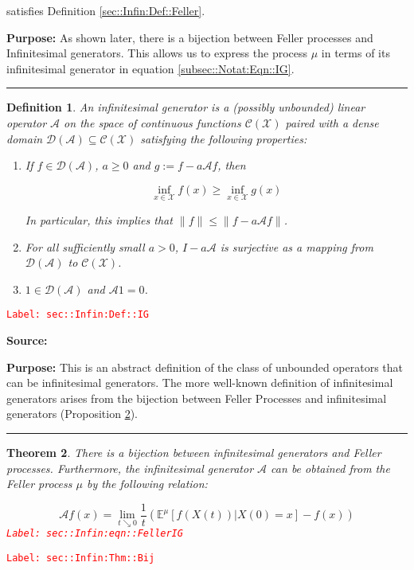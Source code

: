 \documentclass[12pt]{article}
\newcommand{\mb}{\mathbb}
\newcommand{\mc}{\mathcal}
\newcommand{\tr}{\textcolor{red}}
\newcommand{\labe}[1]{\tr{\texttt{Label: #1}}}
\newcommand{\purpose}{\textbf{Purpose: }}
\newcommand{\lin}{\rule{\linewidth}{0.4 pt}}
\newcommand{\exmu}[2]{\mb{E}^{#1}\left[#2\right]}	%
\newcommand{\x}{x}								%
\renewcommand{\t}{t}							%
\newcommand{\X}{X}								%
\newcommand{\IG}{\mc{A}}						%
\newcommand{\tp}[1]{(#1)}						%
\newcommand{\core}{\mc{D}}						%
\newcommand{\cont}{\mc{C}}						%
\newcommand{\m}{\mu}							%
\newcommand{\spce}{\mc{X}}						%
\newtheorem{thms}{Theorem}[section]
\newtheorem{defn}[thms]{Definition}
\begin{document}
satisfies Definition \ref{sec::Infin:Def::Feller}.

\purpose As shown later, there is a bijection between Feller processes and Infinitesimal generators. This allows us to express the process \(\mu\) in terms of its infinitesimal generator in equation \eqref{subsec::Notat:Eqn::IG}.

\lin

\begin{defn}
An infinitesimal generator is a (possibly unbounded) linear operator \(\IG\) on the space of continuous functions \(\cont(\spce)\) paired with a dense domain \(\core(\IG) \subseteq \cont(\spce)\) satisfying the following properties:

\begin{enumerate}
\item If \(f \in \mc{D}(\IG)\), \(a \geq 0\) and \(g:= f - a\IG f\), then 

\[\inf_{\x \in \spce} f(\x) \geq \inf_{\x \in \spce} g(\x)\]

\noindent In particular, this implies that \(\|f\| \leq \|f - a\IG f\|\).

\item For all sufficiently small \(a > 0\), \(I - a\IG\) is surjective as a mapping from \(\mc{D}(\IG)\) to \(\cont(\spce)\).

\item \(1 \in \core(\IG)\) and \(\IG 1 = 0\).
\end{enumerate}
\label{sec::Infin:Def::IG}
\end{defn}
\labe{sec::Infin:Def::IG}

\textbf{Source: }\cite[Definitions 2.1,2.7]{Lig85}

\purpose This is an abstract definition of the class of unbounded operators that can be infinitesimal generators. The more well-known definition of infinitesimal generators arises from the bijection between Feller Processes and infinitesimal generators (Proposition \ref{sec::Infin:Thm::Bij}).

\lin

\begin{thms}
There is a bijection between infinitesimal generators and Feller processes. Furthermore, the infinitesimal generator \(\IG\) can be obtained from the Feller process \(\m\) by the following relation:

\begin{equation}
\IG f(\x) = \lim_{\t\searrow 0} \frac{1}{\t}\left(\exmu{\m}{f(\X\tp{\t})|\X\tp{0}=\x} - f(\x)\right)
\label{sec::Infin:eqn::FellerIG}
\end{equation}
\labe{sec::Infin:eqn::FellerIG}
\label{sec::Infin:Thm::Bij}
\end{thms}
\labe{sec::Infin:Thm::Bij}
\end{document}
